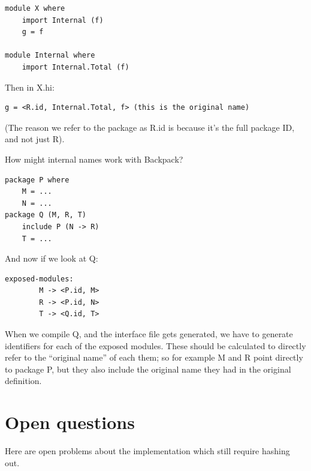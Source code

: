 \documentclass{article}
\begin{document}
\begin{verbatim}
module X where
    import Internal (f)
    g = f

module Internal where
    import Internal.Total (f)
\end{verbatim}

Then in X.hi:

\begin{verbatim}
g = <R.id, Internal.Total, f> (this is the original name)
\end{verbatim}

(The reason we refer to the package as R.id is because it's the
full package ID, and not just R).

How might internal names work with Backpack?

\begin{verbatim}
package P where
    M = ...
    N = ...
package Q (M, R, T)
    include P (N -> R)
    T = ...
\end{verbatim}

And now if we look at Q\@:

\begin{verbatim}
exposed-modules:
        M -> <P.id, M>
        R -> <P.id, N>
        T -> <Q.id, T>
\end{verbatim}

When we compile Q, and the interface file gets generated, we have
to generate identifiers for each of the exposed modules.  These should
be calculated to directly refer to the ``original name'' of each them;
so for example M and R point directly to package P, but they also
include the original name they had in the original definition.


\section{Open questions}\label{sec:open-questions}

Here are open problems about the implementation which still require
hashing out.
\end{document}
